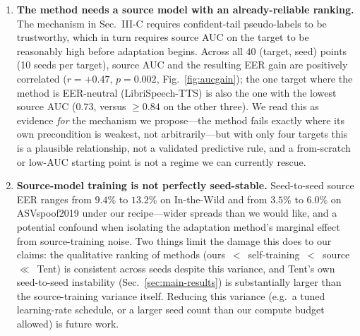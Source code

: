 \documentclass[conference]{IEEEtran}
\begin{document}
\begin{enumerate}
We nonetheless keep $\lambda$ fixed, because acting on the signal does not pay
at a scale we can measure. The entire gap between our fixed $\lambda{=}0.3$ and
a \emph{per-point oracle} that chooses $\lambda\!\in\!\{0,0.3\}$ with knowledge
of the answer is $0.24$ EER pooled over the $12$ points. A leave-one-target-out
threshold on the tail statistic lands inside that gap---better on In-the-Wild,
worse on ASVspoof2019---and its apparent advantage is not stable to the
resolution of the threshold grid it is selected on. Twelve (target, seed)
points cannot settle a $0.24$ EER question, and we decline to present a
selector whose benefit disappears under a finer search as though it were one.
We therefore report the sign, the mechanism it implies, and the negative
instability result, and leave $\lambda$ at a constant.

\item \textbf{The method needs a source model with an already-reliable
ranking.} The mechanism in Sec.~III-C requires confident-tail pseudo-labels to
be trustworthy, which in turn requires source AUC on the target to be
reasonably high before adaptation begins. Across all $40$ (target, seed)
points (10 seeds per target), source AUC and the resulting EER gain are
positively correlated ($r{=}{+}0.47$, $p{=}0.002$, Fig.~\ref{fig:aucgain});
the one target where the method is EER-neutral
(LibriSpeech-TTS) is also the one with the lowest source AUC ($0.73$, versus
$\geq\!0.84$ on the other three). We read this as evidence \emph{for} the
mechanism we propose---the method fails exactly where its own precondition is
weakest, not arbitrarily---but with only four targets this is a plausible
relationship, not a validated predictive rule, and a from-scratch or
low-AUC starting point is not a regime we can currently rescue.

\item \textbf{Source-model training is not perfectly seed-stable.}
Seed-to-seed source EER ranges from $9.4\%$ to $13.2\%$ on In-the-Wild and from
$3.5\%$ to $6.0\%$ on ASVspoof2019 under our recipe---wider spreads than we
would like, and a potential confound when isolating the adaptation method's
marginal effect from source-training noise. Two things limit the damage this
does to our claims: the qualitative ranking of methods
(ours~$<$~self-training~$<$~source~$\ll$~Tent) is consistent across seeds
despite this variance, and Tent's own seed-to-seed instability
(Sec.~\ref{sec:main-results}) is substantially larger than the source-training
variance itself. Reducing this variance (e.g.\ a tuned learning-rate schedule,
or a larger seed count than our compute budget allowed) is future work.


\end{enumerate}
\end{document}
